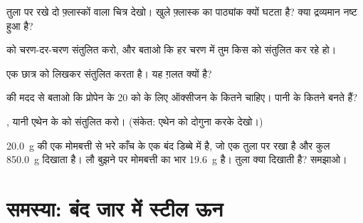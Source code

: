 \begin{exercise}[$\star\star$]\label{exo:g8:balanced-equations:7}
तुला पर रखे दो फ़्लास्कों वाला चित्र देखो। खुले फ़्लास्क का पाठ्यांक क्यों
घटता है? क्या द्रव्यमान नष्ट हुआ है?
\end{exercise}

\begin{exercise}[$\star\star$]\label{exo:g8:balanced-equations:8}
 को चरण-दर-चरण संतुलित करो, और बताओ कि हर %
चरण में तुम किस  को संतुलित कर रहे हो।
\end{exercise}

\begin{exercise}[$\star\star$]\label{exo:g8:balanced-equations:9}
एक छात्र  को  लिखकर संतुलित करता है। %
यह ग़लत क्यों है?
\end{exercise}

\begin{exercise}[$\star\star$]\label{exo:g8:balanced-equations:10}
 की मदद से बताओ कि प्रोपेन के 20  को
 के लिए ऑक्सीजन के कितने  चाहिए। पानी के कितने 
बनते हैं?
\end{exercise}

\begin{exercise}[$\star\star\star$]\label{exo:g8:balanced-equations:11}
, यानी एथेन के  को संतुलित करो। (संकेत: %
एथेन को दोगुना करके देखो।)
\end{exercise}

\begin{exercise}[$\star\star\star$]\label{exo:g8:balanced-equations:12}
\qty{20.0}{g} की एक मोमबत्ती  से भरे काँच के एक बंद डिब्बे में  है,
जो एक तुला पर रखा है और कुल \qty{850.0}{g} दिखाता है। लौ बुझने पर
मोमबत्ती का भार \qty{19.6}{g} है। तुला क्या दिखाती है? समझाओ।
\end{exercise}

\section{समस्या: बंद जार में स्टील ऊन}


